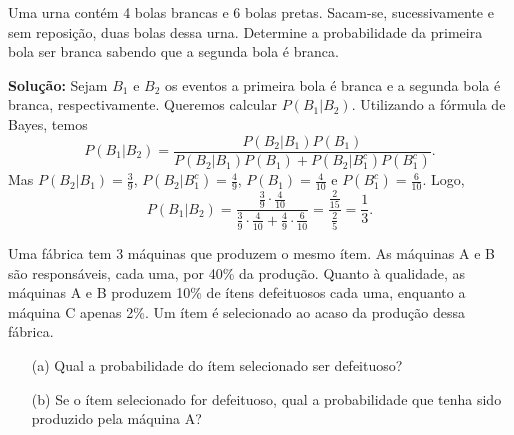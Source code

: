 \begin{frame}
\begin{exer}
Uma urna contém 4 bolas brancas e 6 bolas pretas. Sacam-se,
sucessivamente e sem reposição, duas bolas dessa urna. Determine a
probabilidade da primeira bola ser branca sabendo que a segunda bola
é branca.
\end{exer}

{\bf Solução:} Sejam $B_1$ e $B_2$ os eventos a primeira bola é
branca e a segunda bola é branca, respectivamente. Queremos calcular
$P(B_1|B_2)$. Utilizando a fórmula de Bayes, temos
$$P(B_1|B_2)=\frac{P(B_2|B_1)P(B_1)}{P(B_2|B_1)P(B_1)+P(B_2|B_1^c)P(B_1^c)}.$$
Mas $P(B_2|B_1)=\frac{3}{9}$, $P(B_2|B_1^c)=\frac{4}{9}$,
$P(B_1)=\frac{4}{10}$ e $P(B_1^c)=\frac{6}{10}$. Logo,
$$P(B_1|B_2)=\frac{\frac{3}{9}\cdot\frac{4}{10}}{\frac{3}{9}\cdot\frac{4}{10}+\frac{4}{9}\cdot\frac{6}{10}}=\frac{\frac{2}{15}}{\frac{2}{5}}=\frac{1}{3}.$$

\begin{exer}
Uma fábrica tem 3 máquinas que produzem o mesmo ítem. As máquinas A e B são responsáveis, cada uma, por 40\% da produção. Quanto à qualidade, as máquinas A e B produzem 10\% de ítens defeituosos cada uma, enquanto a máquina C apenas 2\%. Um ítem é selecionado ao acaso da produção dessa fábrica.
\begin{enumerate}
	\item[(a)] Qual a probabilidade do ítem selecionado ser defeituoso?
	\item[(b)] Se o ítem selecionado for defeituoso, qual a probabilidade que tenha sido produzido pela máquina A?
\end{enumerate}	
\end{exer}	

\end{frame}



